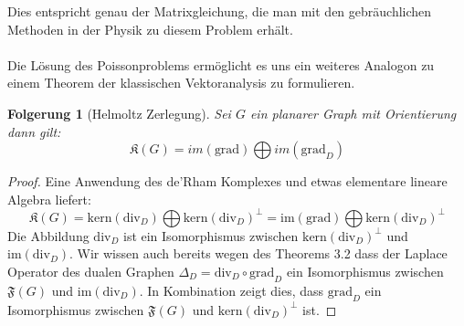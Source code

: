 \documentclass[11pt,a4paper,leqno]{report}
\newtheorem{corollary}[theorem]{Folgerung}
\numberwithin{equation}{chapter}
\begin{document}
Dies entspricht genau der Matrixgleichung, die man mit den gebr\"auchlichen Methoden in der Physik zu diesem Problem erh\"alt.\\
\\
Die L\"osung des Poissonproblems erm\"oglicht es uns ein weiteres Analogon zu einem Theorem der klassischen Vektoranalysis zu formulieren.
\begin{corollary}[Helmoltz Zerlegung]
	Sei $G$ ein planarer Graph mit Orientierung dann gilt:
	$$\mathfrak{K}(G) = im(\text{grad}) \bigoplus im(\text{grad}_D)$$
\end{corollary}
\begin{proof}
	Eine Anwendung des de'Rham Komplexes und etwas elementare lineare Algebra liefert:
	$$\mathfrak{K}(G) = \text{kern}(\text{div}_D)\bigoplus\text{kern}(\text{div}_D)^\perp = \text{im}(\text{grad})\bigoplus\text{kern}(\text{div}_D)^\perp$$	
	Die Abbildung $\text{div}_D$ ist ein Isomorphismus zwischen $\text{kern}(\text{div}_D)^\perp$ und $\text{im}(\text{div}_D)$. Wir wissen auch bereits wegen des Theorems 3.2 dass der Laplace Operator des dualen Graphen $\Delta_D = \text{div}_D\circ\text{grad}_D$ ein Isomorphismus zwischen $\mathfrak{F}(G)$ und $\text{im}(\text{div}_D)$. In Kombination zeigt dies, dass $\text{grad}_D$ ein Isomorphismus zwischen $\mathfrak{F}(G)$ und  $\text{kern}(\text{div}_D)^\perp$ ist.
\end{proof}
\end{document}
